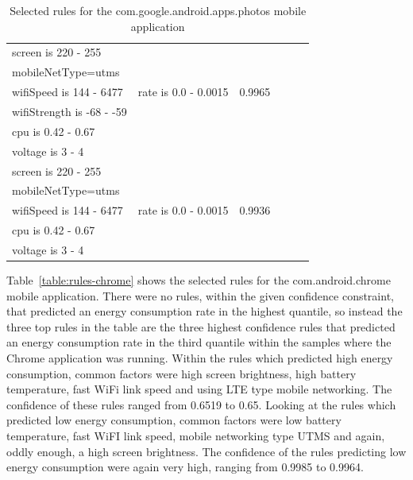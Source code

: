 \begin{table}
\begin{tabular}{|p{5.0cm}|p{3.0cm}|p{2.0cm}|p{1.5cm}|p{0.3cm}| p{0.3cm}|}
\hline
	screen is 220 - 255				& & \\
	mobileNetType=utms				& & \\
	wifiSpeed is 144 - 6477		& rate is 0.0 - 0.0015 & 0.9965 \\
	wifiStrength is -68 - -59		& & \\
	cpu is 0.42 - 0.67				& & \\
	voltage is 3 - 4				& & \\
\hline
	screen is 220 - 255				& & \\
	mobileNetType=utms				& & \\
	wifiSpeed is 144 - 6477		& rate is 0.0 - 0.0015 & 0.9936 \\
	cpu is 0.42 - 0.67				& & \\
	voltage is 3 - 4				& & \\
\hline
\end{tabular}
	\caption{Selected rules for the com.google.android.apps.photos mobile application}
	\label{table:rules-android-photos}
\end{table}

Table~\ref{table:rules-chrome} shows the selected rules for the com.android.chrome mobile application. There were no rules, within the given confidence constraint, that predicted an energy consumption rate in the highest quantile, so instead the three top rules in the table are the three highest confidence rules that predicted an energy consumption rate in the third quantile within the samples where the Chrome application was running. Within the rules which predicted high energy consumption, common factors were high screen brightness, high battery temperature, fast WiFi link speed and using LTE type mobile networking. The confidence of these rules ranged from 0.6519 to 0.65. Looking at the rules which predicted low energy consumption, common factors were low battery temperature, fast WiFI link speed, mobile networking type UTMS and again, oddly enough, a high screen brightness. The confidence of the rules predicting low energy consumption were again very high, ranging from 0.9985 to 0.9964.   

